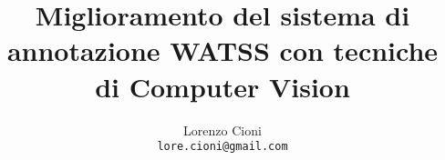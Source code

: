 \documentclass[10pt,twocolumn,letterpaper]{article}
\begin{document}
\title{Miglioramento del sistema di annotazione WATSS con tecniche di Computer Vision}

\author{Lorenzo Cioni\\
{\tt\small lore.cioni@gmail.com}}

\maketitle
\thispagestyle{empty}









{\small


}
\end{document}
